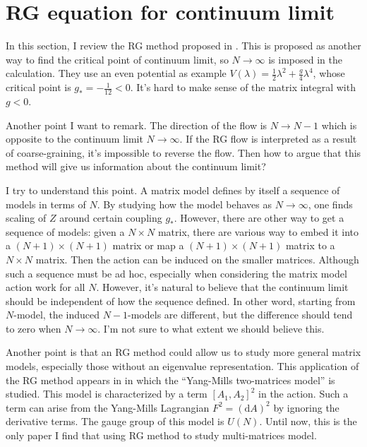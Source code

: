 \section{RG equation for continuum limit}

In this section, I review the RG method proposed in 
.
This is proposed as another way to find the critical point of continuum limit,
so $N\to\infty$ is imposed in the calculation.
They use an even potential as example $V(\lambda)=\frac{1}{2}\lambda^2+\frac{g}{4}\lambda^4$,
whose critical point is $g_*=-\frac{1}{12}<0$.
It's hard to make sense of the matrix integral with $g<0$.

Another point I want to remark.
The direction of the flow is $N\to N-1$ which is opposite to the continuum limit $N\to\infty$. 
If the RG flow is interpreted as a result of coarse-graining,
it's impossible to reverse the flow.
Then how to argue that this method will give us information about the continuum limit?

I try to understand this point.
A matrix model defines by itself a sequence of models in terms of $N$.
By studying how the model behaves as $N\to\infty$, one finds scaling of $Z$ around certain coupling $g_*$.
However, there are other way to get a sequence of models:
given a $N\times N$ matrix, there are various way to embed it into a $(N+1)\times(N+1)$ matrix
or map a $(N+1)\times(N+1)$ matrix to a $N\times N$ matrix.
Then the action can be induced on the smaller matrices.
Although such a sequence must be ad hoc, especially when considering the matrix model action work for all $N$. 
However, it's natural to believe that the continuum limit should be independent of how the sequence defined.
In other word, starting from $N$-model, the induced $N-1$-models are different,
but the difference should tend to zero when $N\to\infty$.
I'm not sure to what extent we should believe this.

Another point is that
an RG method could allow us to study more general matrix models,
especially those without an eigenvalue representation.
This application of the RG method appears in
in which the ``Yang-Mills two-matrices model'' is studied.
This model is characterized by a term $[A_1,A_2]^2$ in the action.
Such a term can arise from the Yang-Mills Lagrangian $F^2=(\mathrm{d}A)^2$ by ignoring the derivative terms.
The gauge group of this model is $U(N)$.
Until now, this is the only paper I find that using RG method to study multi-matrices model.

